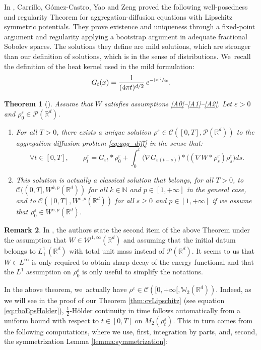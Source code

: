 \documentclass[JEP,XML,SOM,Unicode, NoFloatCountersInSection,published]{cedram}
\def\NN{\mathbb{N}}
\def\RR{\mathbb{R}}
\def\WW{\mathbb{W}}
\def\eps{\varepsilon}
\def\calC{{\mathcal C}}
\def\calP{{\mathcal P}}
\def\calW{{\mathcal W}}
\theoremstyle{plain}
\newtheorem{theorem}{Theorem}[section]
\theoremstyle{definition}
\newtheorem{remark}[theorem]{Remark}
\begin{document}
In \cite{carrilloAsymptotic21}, Carrillo, Gómez-Castro, Yao and Zeng proved the following well-posedness and regularity Theorem for aggregation-diffusion equations with Lipschitz symmetric potentials. They prove existence and uniqueness through a ﬁxed-point argument and regularity applying a bootstrap argument in adequate fractional Sobolev spaces. The solutions they define are mild solutions, which are stronger than our definition of solutions, which is in the sense of distributions. We~recall the definition of the heat kernel used in the mild formulation:
\[
G_t(x) = \frac{1}{(4\pi t)^{d/2}}\, e^{-\sfrac{|x|^2}{4t}}.
\]
\begin{theorem}[{\cite[Th.\,1.1, 2.1 \& 2.2]{carrilloAsymptotic21}}]\label{thm:agg_diff:WP}
Assume that $W$ satisfies assumptions \eqref{A0}--\eqref{A1}--\eqref{A2}. Let $\eps > 0$ and $\rho_0^\eps \in \calP(\RR^d)$.
\begin{enumerate}
\item For all $T>0$, there exists a unique solution $\rho^\eps \in \calC([0,T], \calP(\RR^d))$ to the aggregation-diffusion problem \eqref{eq:agg_diff} in the sense that:
\[
\forall t \in [0,T], \qquad \rho_t^\eps = G_{\eps t} * \rho_0^\eps + \int_0^t \big(\nabla G_{\eps(t-s)}\big) * \big((\nabla W * \rho_s^\eps) \rho_s^\eps\big) ds.
\]
\item This solution is actually a classical solution that belongs, for all $T>0$, to $\calC((0,T], W^{k,p}(\RR^d))$ for all $k \in \NN$ and $p \in [1,+\infty]$ in the general case, and to $\calC([0,T], W^{s,p}(\RR^d))$ for all $s \geq 0$ and $p \in [1,+\infty]$ if we assume that $\rho_0^\eps \in W^{s,p}(\RR^d)$.
\end{enumerate}
\end{theorem}
\begin{remark}
In \cite{carrilloAsymptotic21}, the authors state the second item of the above Theorem under the assumption that $W \in \calW^{1,\infty}(\RR^d)$ and assuming that the initial datum belongs to $L^1_+(\RR^d)$ with total unit mass instead of $\calP(\RR^d)$. It seems to us that $W \in L^\infty$ is only required to obtain sharp decay of the energy functional and that the $L^1$ assumption on $\rho_0^\eps$ is only useful to simplify the notations.
\end{remark}
In the above theorem, we~actually have $\rho^\eps \in \calC([0,+\infty[, \WW_2(\RR^d))$. Indeed, as we will see in the proof of our Theorem \ref{thm:cvLipschitz} (see equation \eqref{eq:rhoEpsHolder}), $\frac 12$-Hölder continuity in time follows automatically from a uniform bound with respect to $t \in [0,T]$ on $M_2(\rho_t^\eps)$. This in turn comes from the following computations, where we use, first, integration by parts, and, second, the symmetrization Lemma \ref{lemma:symmetrization}:
\end{document}
